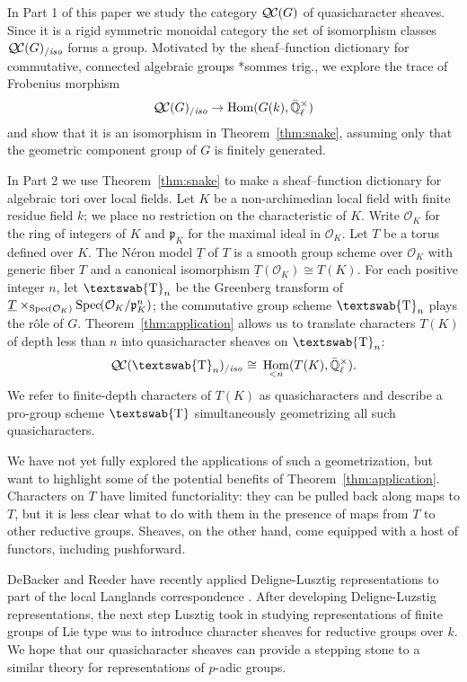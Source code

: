 \documentclass[11pt]{amsart}
\newcommand{\mathswab}[1]{\operatorname{\textswab{#1}}}
\theoremstyle{plain}
\theoremstyle{definition}
\theoremstyle{remark}
\newcommand{\Spec}[1]{{\operatorname{Spec}\hskip-1pt( #1 )}}
\newcommand{\EE}{\mathbb{\bar Q}_\ell}
\newcommand{\OK}{\mathcal{O}_K}
\newcommand{\pK}{\mathfrak{p}_K}
\newcommand{\Fq}{k}
\newcommand{\EEx}{\EE^\times}
\DeclareMathOperator{\Hom}{Hom}
\newcommand{\iso}{{\ \cong\ }}
\newcommand{\GN}[1]{\mathswab{#1}}
\newcommand{\TT}{\underline{T}}
\newcommand{\QC}{{\mathcal{Q\hskip-0.8pt C}}}
\newcommand{\QCiso}[1]{\QC(#1)_{/\textit{iso}}}
\begin{document}
In Part 1 of this paper we study the category $\QC(G)$ of quasicharacter sheaves.
Since it is a rigid symmetric monoidal category
the set of isomorphism classes $\QCiso{G}$ forms a group.
Motivated by the sheaf--function dictionary for commutative, connected
algebraic groups \cite{deligne:SGA4.5}*{sommes trig.}, 
we explore the trace of Frobenius morphism
\[
\QCiso{G} \to \Hom(G(\Fq), \EEx)
\]
and show that it is an isomorphism in Theorem~\ref{thm:snake}, assuming only
that the geometric component group of $G$ is finitely generated.

In Part 2 we use Theorem~\ref{thm:snake} to make a sheaf--function dictionary
for algebraic tori over local fields.  Let $K$ be a non-archimedian local field
with finite residue field $\Fq$; we place no restriction on the characteristic of $K$.
Write $\OK$ for the ring of integers of $K$ and $\pK$ for the maximal ideal in $\OK$.
Let $T$ be a torus defined over $K$.  The N\'eron model $\TT$ of $T$
is a smooth group scheme over $\OK$ with generic fiber $T$ and a canonical isomorphism
$\TT(\OK) \cong T(K)$.  For each positive integer $n$, let $\GN{T}_n$ be the
Greenberg transform of $\TT \times_{\Spec{\OK}} \Spec{\OK/\pK^n}$; the commutative
group scheme $\GN{T}_n$ plays the r\^{o}le of $G$.  Theorem~\ref{thm:application}
allows us to translate characters $T(K)$ of depth less than $n$ into quasicharacter sheaves on $\GN{T}_n$:
\[
\QCiso{\GN{T}_n} 
\iso
\Hom_{< n}(T(K),\EEx).
\]  
We refer to finite-depth characters of $T(K)$ as quasicharacters and
describe a pro-group scheme $\GN{T}$ simultaneously geometrizing all such quasicharacters.

We have not yet fully explored the applications of such a geometrization, but want to highlight
some of the potential benefits of Theorem~\ref{thm:application}.  Characters on $T$ have limited
functoriality: they can be pulled back along maps to $T$, but it is less clear what to do with them
in the presence of maps from $T$ to other reductive groups.  Sheaves, on the other hand, come
equipped with a host of functors, including pushforward.  

DeBacker and Reeder have recently applied Deligne-Lusztig representations to part of the
local Langlands correspondence \cite{reeder-debacker:09a}.  
After developing Deligne-Luzstig representations, 
the next step Lusztig took in studying representations
of finite groups of Lie type was to introduce character sheaves for reductive groups over $\Fq$.
We hope that our quasicharacter sheaves can provide a stepping stone to a similar theory for
representations of $p$-adic groups.
\end{document}
